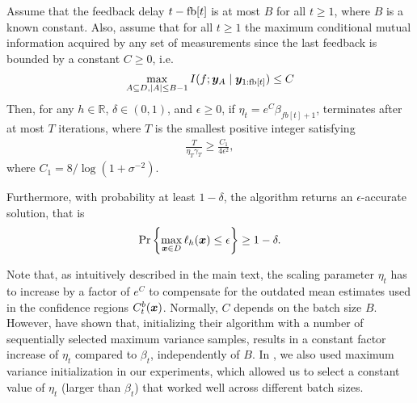 \begin{theorem}
\label{thm:bacl}
Assume that the feedback delay $t - \mathop{\mathrm{fb}}[t]$ is at most $B$ for all $t \geq 1$,
where $B$ is a known constant.
Also, assume that for all $t \geq 1$ the maximum conditional mutual information
acquired by any set of measurements since the last feedback is bounded
by a constant $C \geq 0$, i.e.
\begin{align*}
\max_{A\subseteq D, |A|\leq B-1} I(f; \bm{y}_A \mid \bm{y}_{1:\mathop{\mathrm{fb}}[t]}) \leq C
\end{align*}
Then, for any $h\in\mathbb{R}$, $\delta \in (0, 1)$, and $\epsilon \geq 0$,
if $\eta_t = e^C\beta_{fb[t]+1}$, \bacl terminates after
at most $T$ iterations, where $T$ is the smallest positive integer
satisfying
\begin{align*}
\frac{T}{\eta_T \gamma_T} \geq \frac{C_1}{4\epsilon^2},
\end{align*}
where $C_1 = 8/\log(1 + \sigma^{-2})$.

Furthermore, with probability at least $1-\delta$, the algorithm returns
an $\epsilon$-accurate solution, that is
\begin{align*}
\Pr\left\{\max_{\bm{x}\in D}\ell_h(\bm{x}) \leq \epsilon\right\} \geq 1 - \delta.
\end{align*}
\end{theorem}

Note that, as intuitively described in the main text, the scaling parameter
$\eta_t$ has to increase by a factor of $e^C$ to compensate for the outdated
mean estimates used in the confidence regions $C_t^b(\bm{x})$. Normally, $C$
depends on the batch size $B$. However, \citet{desautels12} have shown that,
initializing their \gpbucb algorithm with a number of sequentially selected
maximum variance samples, results in a constant factor increase of $\eta_t$
compared to $\beta_t$, independently of $B$.
In , we also used maximum variance initialization in our
experiments, which
allowed us to select a constant value of $\eta_t$ (larger than $\beta_t$)
that worked well across different batch sizes.

